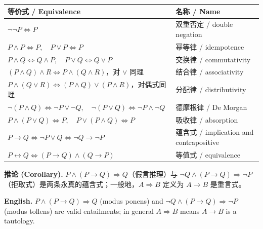 \documentclass[UTF8,11pt,a4paper]{ctexart}
\newcommand{\EN}[1]{\par\noindent \textbf{English.} #1\par}
\newcommand{\COR}[2]{\par\noindent\textbf{推论 (Corollary).} #1\par\EN{#2}}
\begin{document}
\begin{center}\small
\begin{tabular}{@{}p{8.8cm}p{7.0cm}@{}}
\toprule
\textbf{等价式 / Equivalence} & \textbf{名称 / Name} \\
\midrule
$\neg\neg P\Leftrightarrow P$ & 双重否定 / double negation \\
$P\wedge P\Leftrightarrow P,\quad P\vee P\Leftrightarrow P$ & 幂等律 / idempotence \\
$P\wedge Q\Leftrightarrow Q\wedge P,\quad P\vee Q\Leftrightarrow Q\vee P$ & 交换律 / commutativity \\
$(P\wedge Q)\wedge R\Leftrightarrow P\wedge(Q\wedge R)$，对 $\vee$ 同理 & 结合律 / associativity \\
$P\wedge(Q\vee R)\Leftrightarrow(P\wedge Q)\vee(P\wedge R)$，对偶式同理 & 分配律 / distributivity \\
$\neg(P\wedge Q)\Leftrightarrow\neg P\vee\neg Q,\quad \neg(P\vee Q)\Leftrightarrow\neg P\wedge\neg Q$ & 德摩根律 / De Morgan \\
$P\wedge(P\vee Q)\Leftrightarrow P,\quad P\vee(P\wedge Q)\Leftrightarrow P$ & 吸收律 / absorption \\
$P\to Q\Leftrightarrow\neg P\vee Q\Leftrightarrow\neg Q\to\neg P$ & 蕴含式 / implication and contrapositive \\
$P\leftrightarrow Q\Leftrightarrow(P\to Q)\wedge(Q\to P)$ & 等值式 / equivalence \\
\bottomrule
\end{tabular}
\end{center}
\COR{$P\wedge(P\to Q)\Rightarrow Q$（假言推理）与 $\neg Q\wedge(P\to Q)\Rightarrow\neg P$（拒取式）是两条永真的蕴含式；一般地，$A\Rightarrow B$ 定义为 $A\to B$ 是重言式。}{$P\wedge(P\to Q)\Rightarrow Q$ (modus ponens) and $\neg Q\wedge(P\to Q)\Rightarrow\neg P$ (modus tollens) are valid entailments; in general $A\Rightarrow B$ means $A\to B$ is a tautology.}
\end{document}
